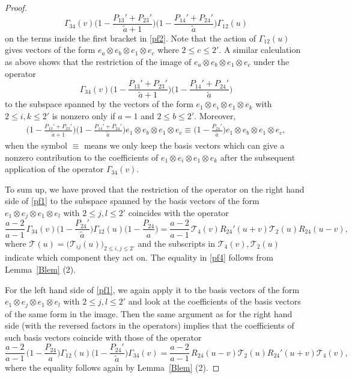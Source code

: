 \documentclass[11pt,reqno]{amsart}
\numberwithin{equation}{section}
\theoremstyle{definition}
\theoremstyle{remark}
\newcommand{\beq}{\begin{equation}}
\newcommand{\eeq}{\end{equation}}
\newcommand{\be}{\begin{equation*}}
\newcommand{\ee}{\end{equation*}}
\newcommand{\mc}{\mathcal}
\newcommand{\tl}{\tilde}
\newcommand{\lle}{\leqslant}
\newcommand{\scrX}{{\mathscr{X}}}
\begin{document}
\begin{proof}
\be
\Gamma_{34}(v)\Big(1-\frac{P_{13}'+P_{23}'}{\tl a+1}\Big)\Big(1-\frac{P_{14}'+P_{24}'}{\tl a}\Big)\Gamma_{12}(u)
\ee
on the terms inside the first bracket in \eqref{pf2}. Note that the action of $\Gamma_{12}(u)$ gives vectors of the form $e_{a}\otimes e_b\otimes e_1\otimes e_{c}$ where $2\lle c\lle 2'$. A similar calculation as above shows that the restriction of the image of $e_{a}\otimes e_b\otimes e_1\otimes e_{c}$ under the operator
$$
\Gamma_{34}(v)\Big(1-\frac{P_{13}'+P_{23}'}{\tl a+1}\Big)\Big(1-\frac{P_{14}'+P_{24}'}{\tl a}\Big)
$$
to the subspace spanned by the vectors of the form $e_{1}\otimes e_i\otimes e_1\otimes e_k$ with $2\lle i,k\lle 2'$ is nonzero only if $a=1$ and $2\lle b\lle 2'$. Moreover,
\begin{align*}
\Big(1-\frac{P_{13}'+P_{23}'}{\tl a+1}\Big)\Big(1-\frac{P_{14}'+P_{24}'}{\tl a}\Big)e_{1}\otimes e_b\otimes e_1\otimes e_{c}\equiv  \Big(1-\frac{P_{24}'}{\tl a}\Big)e_{1}\otimes e_b\otimes e_1\otimes e_{c},
\end{align*}
when the symbol $\equiv$ means we only keep the basis vectors which can give a nonzero contribution to the coefficients of $e_1\otimes e_i\otimes e_1\otimes e_k$ after the subsequent application of the operator $\Gamma_{34}(v)$.

To sum up, we have proved that the restriction of the operator on the right hand side of \eqref{pf1} to the subspace spanned by the basis vectors of the form $e_1\otimes e_j\otimes e_1\otimes e_l$ with $2\lle j,l\lle 2'$ coincides with the operator
\beq\label{pf4}
\frac{a-2}{a-1}\,\Gamma_{34}(v)\Big(1-\frac{P_{24}'}{\tl a}\Big)\Gamma_{12}(u)\Big(1-\frac{P_{24}}{a}\Big)=\frac{a-2}{a-1}\, \mc T_{4}(v) R_{24}'(u+v) \mc T_{2}(u)R_{24}(u-v),
\eeq
where $\mc T(u)= \big(\mc T_{ij}(u)\big)_{2\lle i,j\lle 2'}$ and the subscripts in $\mc T_{4}(v),\mc T_{2}(u)$ indicate which component they act on. The equality in \eqref{pf4} follows from Lemma~\ref{Blem} (2).


For the left hand side of \eqref{pf1}, we again apply it to the basis vectors of the form $e_1\otimes e_j\otimes e_1\otimes e_l$ with $2\lle j,l\lle 2'$ and look at the coefficients of the basis vectors of the same form in the image. Then the same argument as for the right hand side (with the reversed factors in the operators) implies that the coefficients of such basis vectors coincide with those of the operator
\beq\label{pf5}
\frac{a-2}{a-1}\,\Big(1-\frac{P_{24}}{a}\Big)\Gamma_{12}(u)\Big(1-\frac{P_{24}'}{\tl a}\Big)\Gamma_{34}(v)=\frac{a-2}{a-1}\,R_{24}(u-v) \mc T_{2}(u) R_{24}'(u+v) \mc T_{4}(v),
\eeq
where the equality follows again by Lemma~\ref{Blem} (2).


\end{proof}
\end{document}
